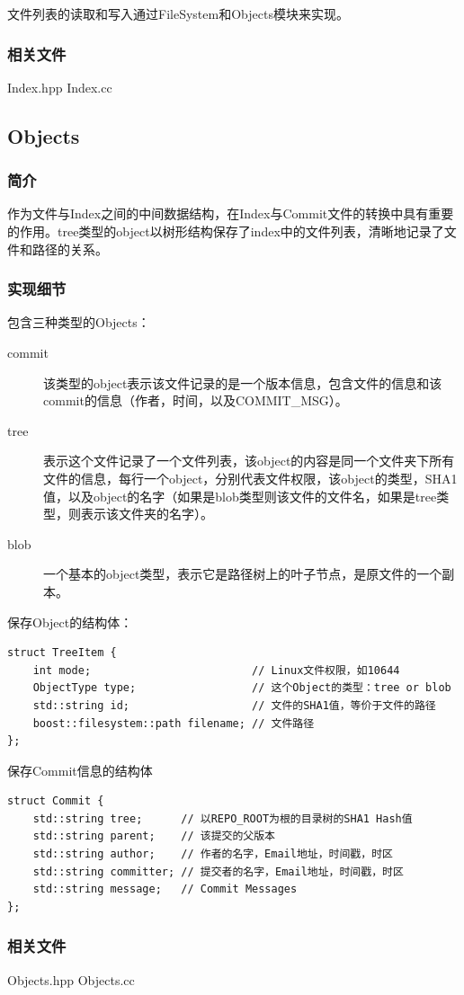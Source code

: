 \documentclass[11pt, a4paper, UTF8]{ctexart}
\begin{document}
文件列表的读取和写入通过FileSystem和Objects模块来实现。
\subsubsection{相关文件}
Index.hpp Index.cc

\subsection{Objects}
\subsubsection{简介}
作为文件与Index之间的中间数据结构，在Index与Commit文件的转换中具有重要的作用。tree类型的object以树形结构保存了index中的文件列表，清晰地记录了文件和路径的关系。
\subsubsection{实现细节}
包含三种类型的Objects：
\begin{description}
	\item[commit] 该类型的object表示该文件记录的是一个版本信息，包含文件的信息和该commit的信息（作者，时间，以及COMMIT\_MSG）。
	\item[tree] 表示这个文件记录了一个文件列表，该object的内容是同一个文件夹下所有文件的信息，每行一个object，分别代表文件权限，该object的类型，SHA1值，以及object的名字（如果是blob类型则该文件的文件名，如果是tree类型，则表示该文件夹的名字）。
	\item[blob] 一个基本的object类型，表示它是路径树上的叶子节点，是原文件的一个副本。
\end{description}
保存Object的结构体：
\begin{lstlisting}
struct TreeItem {
	int mode;                         // Linux文件权限，如10644
	ObjectType type;                  // 这个Object的类型：tree or blob
	std::string id;                   // 文件的SHA1值，等价于文件的路径
	boost::filesystem::path filename; // 文件路径
};
\end{lstlisting}
保存Commit信息的结构体
\begin{lstlisting}
struct Commit {
	std::string tree;      // 以REPO_ROOT为根的目录树的SHA1 Hash值
	std::string parent;    // 该提交的父版本
	std::string author;    // 作者的名字，Email地址，时间戳，时区
	std::string committer; // 提交者的名字，Email地址，时间戳，时区
	std::string message;   // Commit Messages
};
\end{lstlisting}
\subsubsection{相关文件}
Objects.hpp Objects.cc
\end{document}
